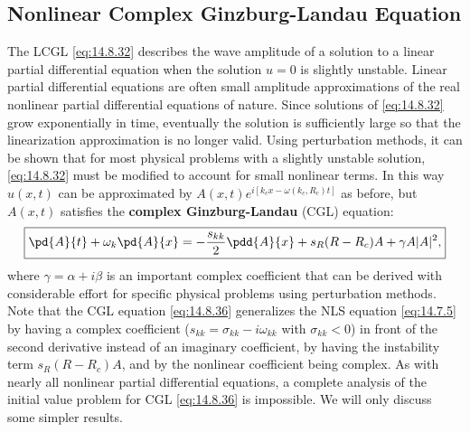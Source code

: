\subsection{Nonlinear Complex Ginzburg-Landau Equation}
\label{subsec:14.8.6}

The LCGL \eqref{eq:14.8.32} describes the wave amplitude of a solution to a linear partial differential equation when the solution $u = 0$ is slightly unstable. Linear partial differential equations are often small amplitude approximations of the real nonlinear partial differential equations of nature. Since solutions of \eqref{eq:14.8.32} grow exponentially in time, eventually the solution is sufficiently large so that the linearization approximation is no longer valid. Using perturbation methods, it can be shown that for most physical problems with a slightly unstable solution, \eqref{eq:14.8.32} must be modified to account for small nonlinear terms. In this way $u(x,t)$ can be approximated by $A(x,t)e^{i[k_c x - \omega(k_c, R_c)t]}$ as before, but $A(x,t)$ satisfies the \textbf{complex Ginzburg-Landau} (CGL) equation:
\begin{equation}
\boxed{\pd{A}{t} + \omega_k\pd{A}{x} = -\frac{s_{kk}}{2}\pdd{A}{x} + s_R(R - R_c)A + \gamma A|A|^2,}
\label{eq:14.8.36}
\end{equation}
where $\gamma = \alpha + i\beta$ is an important complex coefficient that can be derived with considerable effort for specific physical problems using perturbation methods. Note that the CGL equation \eqref{eq:14.8.36} generalizes the NLS equation \eqref{eq:14.7.5} by having a complex coefficient ($s_{kk} = \sigma_{kk} - i\omega_{kk}$ with $\sigma_{kk} < 0$) in front of the second derivative instead of an imaginary coefficient, by having the instability term $s_R(R - R_c)A$, and by the nonlinear coefficient being complex. As with nearly all nonlinear partial differential equations, a complete analysis of the initial value problem for CGL \eqref{eq:14.8.36} is impossible. We will only discuss some simpler results.

